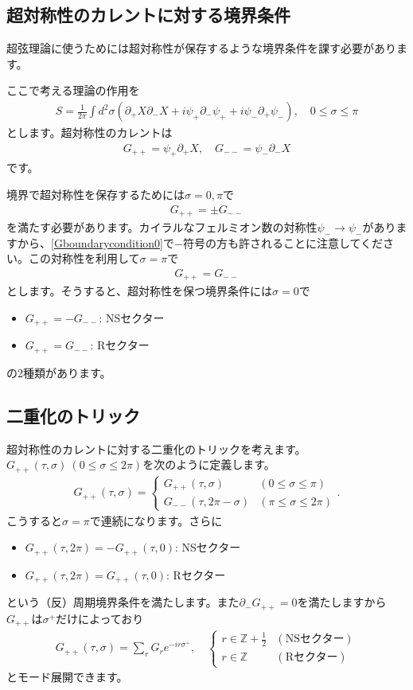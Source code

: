 \documentclass[report,paper=a4, fontsize=12pt, line_length=16cm, number_of_lines=34,dvipdfmx]{jlreq}
\numberwithin{equation}{chapter}
\numberwithin{equation}{section}
\newcommand{\Zb}{\mathbb{Z}}
\newcommand{\del}{\partial}
\newcommand{\Zbh}{\Zb+\frac12}
\begin{document}
\subsection{超対称性のカレントに対する境界条件}
超弦理論に使うためには超対称性が保存するような境界条件を課す必要があります。

ここで考える理論の作用を
\begin{align}
  S=\frac{1}{2\pi}\int d^2\sigma \left( 
    \del_{+}X \del_{-} X+i\psi_{+}\del_{-}\psi_{+}+i\psi_{-}\del_{+}\psi_{-}
   \right),\quad 0\le \sigma \le \pi
\end{align}
とします。超対称性のカレントは
\begin{align}
  G_{++}=\psi_{+}\del_{+}X,\quad
  G_{--}=\psi_{-}\del_{-}X  
\end{align}
です。

境界で超対称性を保存するためには$\sigma=0,\pi$で
\begin{align}
  G_{++}=\pm G_{--}\label{Gboundarycondition0}
\end{align}
を満たす必要があります。カイラルなフェルミオン数の対称性$\psi_{-}\to \psi_{-}$がありますから、\eqref{Gboundarycondition0}で$-$符号の方も許されることに注意してください。この対称性を利用して$\sigma=\pi$で
\begin{align}
  G_{++}=G_{--}
\end{align}
とします。そうすると、超対称性を保つ境界条件には$\sigma=0$で
\begin{itemize}
  \item $G_{++}=-G_{--}$: NSセクター
  \item $G_{++}=G_{--}$: Rセクター
\end{itemize}
の2種類があります。

\subsection{二重化のトリック}
超対称性のカレントに対する二重化のトリックを考えます。$G_{++}(\tau,\sigma)\ (0\le \sigma \le 2\pi)$を次のように定義します。
\begin{align}
  G_{++}(\tau,\sigma)
  =
  \begin{cases}
    G_{++}(\tau,\sigma) & (0\le \sigma \le \pi)\\
    G_{--}(\tau,2\pi-\sigma) & (\pi\le \sigma \le 2\pi)
  \end{cases}.
\end{align}
こうすると$\sigma=\pi$で連続になります。さらに
\begin{itemize}
  \item $G_{++}(\tau,2\pi)=-G_{++}(\tau,0)$: NSセクター
  \item $G_{++}(\tau,2\pi)=G_{++}(\tau,0)$: Rセクター
\end{itemize}
という（反）周期境界条件を満たします。また$\del_{-}G_{++}=0$を満たしますから$G_{++}$は$\sigma^{+}$だけによっており
\begin{align}
  G_{++}(\tau,\sigma)=\sum_{r}G_{r}e^{-ir\sigma^{+}},\quad
  \begin{cases}
    r\in \Zbh & (\text{NSセクター})\\
    r\in \Zb & (\text{Rセクター})
  \end{cases}
\end{align}
とモード展開できます。
\end{document}
